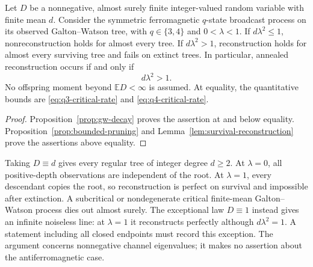 \begin{theorem}
\label{thm:full-finite-mean-dichotomy}
Let $D$ be a nonnegative, almost surely finite integer-valued random
variable with finite mean $d$.  Consider the symmetric ferromagnetic
$q$-state broadcast process on its observed Galton--Watson tree, with
$q\in\{3,4\}$ and $0<\lambda<1$.
If $d\lambda^2\le1$, nonreconstruction holds for almost every tree.
If $d\lambda^2>1$, reconstruction holds for almost every surviving
tree and fails on extinct trees.  In particular, annealed reconstruction
occurs if and only if
\[
 d\lambda^2>1.
\]
No offspring moment beyond $\mathbb E D<\infty$ is assumed.  At equality,
the quantitative bounds are \eqref{eq:q3-critical-rate} and
\eqref{eq:q4-critical-rate}.
\end{theorem}

\begin{proof}
Proposition~\ref{prop:gw-decay} proves the assertion at and below equality.
Proposition~\ref{prop:bounded-pruning} and
Lemma~\ref{lem:survival-reconstruction} prove the assertions above equality.
\end{proof}

\begin{remark}
Taking $D\equiv d$ gives every regular tree of integer degree $d\ge2$.
At $\lambda=0$, all positive-depth observations are independent of the
root.  At $\lambda=1$, every descendant copies the root, so reconstruction
is perfect on survival and impossible after extinction.  A subcritical
or nondegenerate critical finite-mean Galton--Watson process dies out
almost surely.  The exceptional law $D\equiv1$ instead gives an infinite
noiseless line: at $\lambda=1$ it reconstructs perfectly although
$d\lambda^2=1$.  A statement including all closed endpoints must record
this exception.  The argument concerns nonnegative channel eigenvalues;
it makes no assertion about the antiferromagnetic case.
\end{remark}

